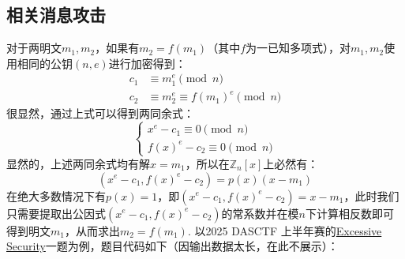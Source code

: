 \documentclass{book}
\numberwithin{equation}{subsubsection}
\begin{document}
\subsection{相关消息攻击\cite{11}}
对于两明文$m_1,m_2$，如果有$m_2=f(m_1)$（其中$f$为一已知多项式），对$m_1,m_2$使用相同的公钥$(n,e)$进行加密得到：
\begin{equation}
    \begin{aligned}
        c_1 &\equiv m_1^e\pmod{n} \\
        c_2 &\equiv m_2^e\equiv f(m_1)^e\pmod{n}
    \end{aligned}
    \nonumber
\end{equation}
很显然，通过上式可以得到两同余式：
\begin{equation}
    \begin{cases}
        x^e - c_1\equiv 0\pmod{n} \\
        f(x)^e - c_2\equiv 0\pmod{n}
    \end{cases}
    \nonumber
\end{equation}
显然的，上述两同余式均有解$x=m_1$，所以在$\mathbb{Z}_n[x]$上必然有：
\begin{equation}
    (x^e - c_1, f(x)^e - c_2) = p(x)(x-m_1)
    \nonumber
\end{equation}
在绝大多数情况下有$p(x)=1$，即$(x^e - c_1, f(x)^e - c_2) = x-m_1$，此时我们只需要提取出公因式$(x^e - c_1, f(x)^e - c_2)$的常系数并在模$n$下计算相反数即可得到明文$m_1$，从而求出$m_2=f(m_1)$.
以2025 DASCTF 上半年赛的\href{https://ctf2.dasctf.com/dashboard/practice/b9bbb32f-f186-458f-b90b-12440c0f6aea?returnTo=%2Fdashboard%2Fpractice&tab=challenges&challenge=6eb6f680-635a-4932-9704-c2cefa444ed1}{Excessive Security}一题为例，题目代码如下（因输出数据太长，在此不展示）：
\end{document}
